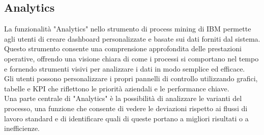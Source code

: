 \documentclass{article}
\begin{document}
\subsection{Analytics}
La funzionalità "Analytics" nello strumento di process mining di IBM permette agli utenti di creare dashboard personalizzate e basate sui dati forniti dal sistema. Questo strumento consente una comprensione approfondita delle prestazioni operative, offrendo una visione chiara di come i processi si comportano nel tempo e fornendo strumenti visivi per analizzare i dati in modo semplice ed efficace.\\
Gli utenti possono personalizzare i propri pannelli di controllo utilizzando grafici, tabelle e KPI che riflettono le priorità aziendali e le performance chiave.\\
Una parte centrale di "Analytics" è la possibilità di analizzare le varianti del processo, una funzione che consente di vedere le deviazioni rispetto ai flussi di lavoro standard e di identificare quali di queste portano a migliori risultati o a inefficienze.\\
\end{document}
